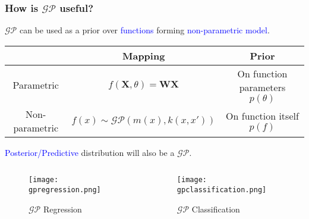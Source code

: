 \documentclass[10pt,handout]{beamer}
\begin{document}
\begin{frame}
\frametitle{How is $\mathcal{GP}$ useful?}

$\mathcal{GP}$ can be used as a prior over \textcolor{blue}{functions} forming \textcolor{blue}{non-parametric model}.

\begin{table}
\centering 
\begin{tabular}{c || c | c} 
 & Mapping & Prior \\ [1ex] 
\hline \hline 
Parametric & $f(\mathbf{X},\theta) = \mathbf{W}\mathbf{X}$ & On function parameters $p(\theta)$ \\ [1ex]
\hline
Non-parametric & $f(x) \sim \mathcal{GP}(m(x),k(x,x'))$ & On function itself $p(f)$\\ [1ex] 
\end{tabular}
\end{table}

\textcolor{blue}{Posterior/Predictive} distribution will also be a $\mathcal{GP}$.

\begin{columns}[t]
  \begin{column}[t]{0.48\textwidth}
    \centering
    \begin{figure}
      \caption*{$\mathcal{GP}$ Regression}
      \texttt{[image: gpregression.png]}
    \end{figure}
  \end{column}
  \begin{column}[t]{0.48\textwidth}
    \centering
    \begin{figure}
      \caption*{$\mathcal{GP}$ Classification}
      \texttt{[image: gpclassification.png]}
    \end{figure}
  \end{column}
\end{columns}

\end{frame}
\end{document}
